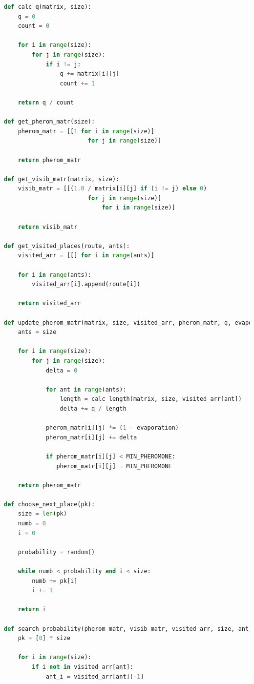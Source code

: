 \documentclass[a4paper,14pt, unknownkeysallowed]{extreport}
\begin{document}
\begin{lstlisting}[label=ant,caption=Реализация муравьиного алгорима,language=Python]
def calc_q(matrix, size):
    q = 0
    count = 0

    for i in range(size):
        for j in range(size):
            if i != j:
                q += matrix[i][j]
                count += 1

    return q / count

def get_pherom_matr(size):
    pherom_matr = [[1 for i in range(size)] 
                        for j in range(size)]

    return pherom_matr

def get_visib_matr(matrix, size):
    visib_matr = [[(1.0 / matrix[i][j] if (i != j) else 0) 
                        for j in range(size)] 
                            for i in range(size)]

    return visib_matr

def get_visited_places(route, ants):
    visited_arr = [[] for i in range(ants)]

    for i in range(ants):
        visited_arr[i].append(route[i])

    return visited_arr

def update_pherom_matr(matrix, size, visited_arr, pherom_matr, q, evaporation):
    ants = size

    for i in range(size):
        for j in range(size):
            delta = 0

            for ant in range(ants):
                length = calc_length(matrix, size, visited_arr[ant])
                delta += q / length

            pherom_matr[i][j] *= (1 - evaporation)
            pherom_matr[i][j] += delta

            if pherom_matr[i][j] < MIN_PHEROMONE:
               pherom_matr[i][j] = MIN_PHEROMONE

    return pherom_matr

def choose_next_place(pk):
    size = len(pk)
    numb = 0
    i = 0

    probability = random()

    while numb < probability and i < size:
        numb += pk[i]
        i += 1

    return i

def search_probability(pherom_matr, visib_matr, visited_arr, size, ant, alpha, beta):
    pk = [0] * size

    for i in range(size):
        if i not in visited_arr[ant]:
            ant_i = visited_arr[ant][-1]


\end{lstlisting}
\end{document}
